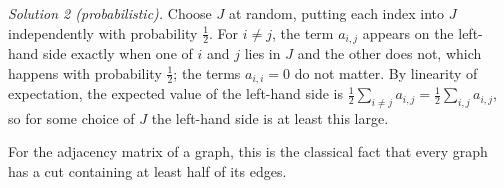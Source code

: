 \begin{solution}
    \textit{Solution 2 (probabilistic).}
    Choose \( J \) at random, putting each index into \( J \) independently with probability \( \frac{1}{2} \). For \( i \neq j \), the term \( a_{i,j} \) appears on the left-hand side exactly when one of \( i \) and \( j \) lies in \( J \) and the other does not, which happens with probability \( \frac{1}{2} \); the terms \( a_{i,i} = 0 \) do not matter. By linearity of expectation, the expected value of the left-hand side is \( \frac{1}{2} \sum_{i \neq j} a_{i,j} = \frac{1}{2} \sum_{i,j} a_{i,j} \), so for some choice of \( J \) the left-hand side is at least this large.

    \begin{remark}
        For the adjacency matrix of a graph, this is the classical fact that every graph has a cut containing at least half of its edges.
    \end{remark}
\end{solution}
